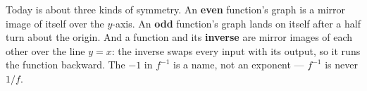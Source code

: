 \documentclass[10pt]{article}
\begin{document}
\vspace{0.14in}

\begin{remindbox}
\small
Today is about three kinds of symmetry. An \textbf{even} function's graph is a mirror image of
itself over the $y$-axis. An \textbf{odd} function's graph lands on itself after a half turn
about the origin. And a function and its \textbf{inverse} are mirror images of each other over
the line $y = x$: the inverse swaps every input with its output, so it runs the function
backward. The $-1$ in $f^{-1}$ is a name, not an exponent --- $f^{-1}$ is never $1/f$.
\end{remindbox}
\end{document}
